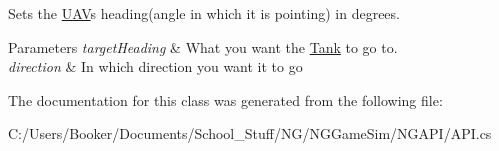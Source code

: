 Sets the \hyperlink{class_n_g_a_p_i_1_1_u_a_v}{U\+AV}\textquotesingle{}s heading(angle in which it is pointing) in degrees. 


\begin{DoxyParams}{Parameters}
{\em target\+Heading} & What you want the \hyperlink{class_n_g_a_p_i_1_1_tank}{Tank} to go to. \\
\hline
{\em direction} & In which direction you want it to go \\
\hline
\end{DoxyParams}


The documentation for this class was generated from the following file\+:\begin{DoxyCompactItemize}
\item 
C\+:/\+Users/\+Booker/\+Documents/\+School\+\_\+\+Stuff/\+N\+G/\+N\+G\+Game\+Sim/\+N\+G\+A\+P\+I/A\+P\+I.\+cs\end{DoxyCompactItemize}
